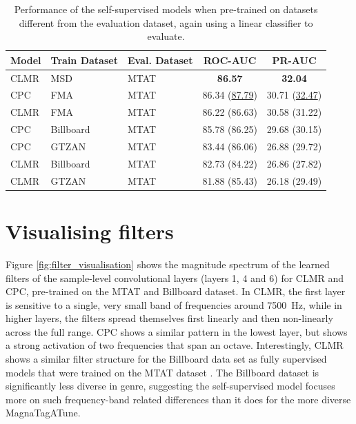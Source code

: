 \begin{table}[t]
    \centering
    \begin{tabular}{@{}lllcc@{}}\toprule
        Model & Train Dataset & Eval.
Dataset &  ROC-AUC & PR-AUC \\ \midrule
        CLMR & MSD & MTAT &  \textbf{86.57} & \textbf{32.04} \\
        CPC & FMA & MTAT & 86.34 (\underline{87.79}) & 30.71 (\underline{32.47}) \\
        CLMR & FMA & MTAT & 86.22 (86.63) & 30.58 (31.22) \\
        CPC & Billboard & MTAT & 85.78 (86.25) & 29.68 (30.15) \\
        CPC & GTZAN & MTAT & 83.44 (86.06) & 26.88 (29.72) \\
        CLMR & Billboard & MTAT & 82.73 (84.22) & 26.86 (27.82) \\
        CLMR & GTZAN & MTAT & 81.88 (85.43) & 26.18 (29.49) \\
        \bottomrule
    \end{tabular}
    \caption{Performance of the self-supervised models when pre-trained on datasets different from the evaluation dataset, again using a linear classifier to evaluate.}
    \label{tab:magnatagatune_results}
\end{table}



\section{Visualising filters}
Figure \ref{fig:filter_visualisation} shows the magnitude spectrum of the learned filters of the sample-level convolutional layers (layers 1, 4 and 6) for CLMR and CPC, pre-trained on the MTAT and Billboard dataset.
In CLMR, the first layer is sensitive to a single, very small band of frequencies around 7500~Hz, while in higher layers, the filters spread themselves first linearly and then non-linearly across the full range.
CPC shows a similar pattern in the lowest layer, but shows a strong activation of two frequencies that span an octave.
Interestingly, CLMR shows a similar filter structure for the Billboard data set as fully supervised models that were trained on the MTAT dataset \cite{dieleman2014end,lee2018samplecnn}.
The Billboard dataset is significantly less diverse in genre, suggesting the self-supervised model focuses more on such frequency-band related differences than it does for the more diverse Magna\-Tag\-A\-Tune.

